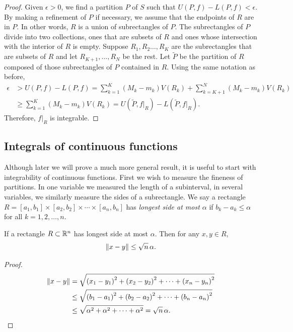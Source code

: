 \begin{proof}
Given $\epsilon > 0$, we find a partition $P$ of $S$ such that
$U(P,f)-L(P,f) < \epsilon$.  By making a refinement of $P$
if necessary,
we assume that the endpoints of $R$ are in $P$.  In other words,
$R$ is a union of subrectangles of $P$.  The subrectangles of $P$
divide into two collections, ones that are subsets of $R$
and ones whose intersection with the interior of $R$ is empty.
Suppose $R_1,R_2\ldots,R_K$ are the subrectangles that
are subsets of $R$ and let $R_{K+1},\ldots, R_N$ be the rest.
Let $\widetilde{P}$ be the partition of $R$ composed of 
those subrectangles of $P$ contained in $R$.
Using the same notation as before,
\begin{equation*}
\begin{split}
\epsilon & > 
U(P,f)-L(P,f)
=
\sum_{k=1}^K (M_k-m_k) V(R_k)
+
\sum_{k=K+1}^N (M_k-m_k) V(R_k)
\\
&
\geq
\sum_{k=1}^K (M_k-m_k) V(R_k)
=
U(\widetilde{P},f|_R)-L(\widetilde{P},f|_R) .
\end{split}
\end{equation*}
Therefore, $f|_R$ is integrable.
\end{proof}

\subsection{Integrals of continuous functions}

Although later we will prove a much more general result, it is useful to start
with integrability of continuous functions.
First we wish to measure the fineness of partitions.  In one variable we
measured the length of a subinterval, in several variables, we similarly
measure the sides of a subrectangle.
We say a rectangle $R = [a_1,b_1] \times
[a_2,b_2] \times \cdots \times
[a_n,b_n]$ has \emph{longest side at most $\alpha$} if
$b_k-a_k \leq \alpha$ for all $k=1,2,\ldots,n$.

\begin{prop} \label{prop:diameterrectangle}
If a rectangle $R \subset {\mathbb{R}}^n$ has longest side at most $\alpha$.  Then
for any $x,y \in R$,
\begin{equation*}
\lVert {x-y} \rVert \leq \sqrt{n} \, \alpha .
\end{equation*}
\end{prop}

\begin{proof}
\begin{equation*}
\begin{split}
\lVert {x-y} \rVert 
& =
\sqrt{
{(x_1-y_1)}^2
+
{(x_2-y_2)}^2
+ \cdots +
{(x_n-y_n)}^2
}
\\
& \leq
\sqrt{
{(b_1-a_1)}^2
+
{(b_2-a_2)}^2
+ \cdots +
{(b_n-a_n)}^2
}
\\
& \leq
\sqrt{
{\alpha}^2
+
{\alpha}^2
+ \cdots +
{\alpha}^2
}
=
\sqrt{n} \, \alpha .  \qedhere
\end{split}
\end{equation*}
\end{proof}


